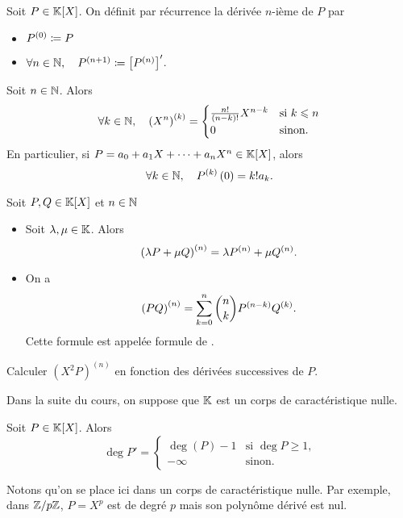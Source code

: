 \documentclass{magnolia}
\begin{document}
\begin{definition}
Soit $P\in\polyK$. On définit par récurrence la dérivée $n$-ième de $P$ par
\begin{itemize}
\item $P^{(0)}\coloneqq P$
\item $\forall n\in\mathbb{N} ,\quad P^{(n+1)}\coloneqq \left[P^{(n)}\right]'$.
\end{itemize}
\end{definition}

\begin{remarqueUnique}
\remarque Soit $n\in\mathbb{N}$. Alors
  \[\forall k\in\mathbb{N} ,\quad \left(X^n\right)^{(k)}=
    \begin{cases}
    \frac{n!}{\left(n-k\right)!}X^{n-k} &\text{si $k\leqslant n$}\\
    0 & \text{sinon.}
    \end{cases}\]
  En particulier, si $P=a_0+a_1X+\cdots+a_nX^n\in\polyK$, alors
  \[\forall k\in\mathbb{N} ,\quad P^{(k)}\left(0\right)=k! a_k.\]
\end{remarqueUnique}

\begin{proposition}
Soit $P,Q\in\polyK$ et $n\in\mathbb{N}$
\begin{itemize}
\item Soit $\lambda,\mu\in\mathbb{K}$. Alors
  \[\left(\lambda P+\mu Q\right)^{(n)}=\lambda P^{(n)}+\mu Q^{(n)}.\]
\item On a
  \[\left(PQ\right)^{(n)}=\sum_{k=0}^n \binom{n}{k}P^{(n-k)}Q^{(k)}.\]
  Cette formule est appelée formule de .
\end{itemize}
\end{proposition}

\begin{exoUnique}
\exo Calculer $(X^2P)^{(n)}$ en fonction des dérivées successives de $P$.
\end{exoUnique}

Dans la suite du cours, on suppose que $\mathbb{K}$ est un corps de caractéristique nulle.

\begin{proposition}
Soit $P\in\polyK$. Alors
\[\deg P'=
  \begin{cases}
  \deg(P)-1 & \text{si $\deg P\geq 1$,}\\
  -\infty & \text{sinon.}
  \end{cases}\]
\end{proposition}

\begin{preuve}
Notons qu'on se place ici dans un corps de caractéristique nulle. Par exemple, dans $\mathbb{Z}/p\mathbb{Z}$, $P=X^p$ est de degré $p$ mais son polynôme dérivé est nul.
\end{preuve}
\end{document}
